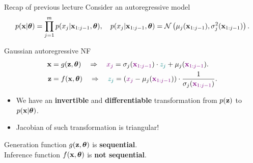 \begin{frame}{Recap of previous lecture}
	Consider an autoregressive model
	\vspace{-0.3cm}
	{\small
		\[
		p(\mathbf{x} | \boldsymbol{\theta}) = \prod_{j=1}^m p(x_j | \mathbf{x}_{1:j - 1}, \boldsymbol{\theta}), \quad
		p(x_j | \mathbf{x}_{1:j - 1}, \boldsymbol{\theta}) = \mathcal{N} \left(\mu_j(\mathbf{x}_{1:j-1}), \sigma^2_j (\mathbf{x}_{1:j-1})\right).
		\]
	}
	\vspace{-0.5cm}
	\begin{block}{Gaussian autoregressive NF}
		\vspace{-0.5cm}
		\begin{align*}
			\mathbf{x} &= g(\mathbf{z}, \boldsymbol{\theta}) \quad \Rightarrow \quad {\color{violet} x_j} = \sigma_j ({\color{violet} \mathbf{x}_{1:j-1}}) \cdot {\color{teal} z_j} + \mu_j({\color{violet} \mathbf{x}_{1:j-1}}). \\
			\mathbf{z} &= f(\mathbf{x}, \boldsymbol{\theta}) \quad \Rightarrow \quad {\color{teal} z_j} = \left({\color{violet}x_j} - \mu_j({\color{violet}\mathbf{x}_{1:j-1}}) \right) \cdot \frac{1}{ \sigma_j ({\color{violet}\mathbf{x}_{1:j-1}})}.
		\end{align*}
		\vspace{-0.5cm}
	\end{block}
	\begin{itemize}
		\item We have an \textbf{invertible} and \textbf{differentiable} transformation from $p(\mathbf{z})$ to $p(\mathbf{x} | \boldsymbol{\theta})$.
		\item Jacobian of such transformation is triangular!
	\end{itemize}
	Generation function $g(\mathbf{z}, \boldsymbol{\theta})$ is \textbf{sequential}. \\ Inference function $f(\mathbf{x}, \boldsymbol{\theta})$ is \textbf{not sequential}.
	
\end{frame}
